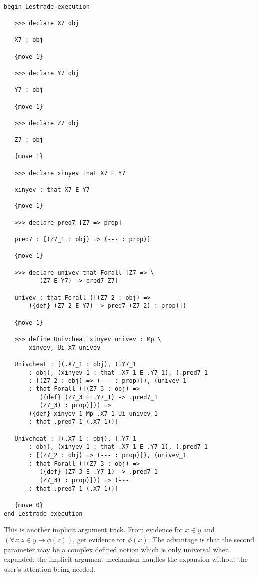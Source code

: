 \documentclass[12pt]{article}
\begin{document}
\begin{verbatim}

begin Lestrade execution

   >>> declare X7 obj

   X7 : obj

   {move 1}

   >>> declare Y7 obj

   Y7 : obj

   {move 1}

   >>> declare Z7 obj

   Z7 : obj

   {move 1}

   >>> declare xinyev that X7 E Y7

   xinyev : that X7 E Y7

   {move 1}

   >>> declare pred7 [Z7 => prop]

   pred7 : [(Z7_1 : obj) => (--- : prop)]

   {move 1}

   >>> declare univev that Forall [Z7 => \
          (Z7 E Y7) -> pred7 Z7]

   univev : that Forall ([(Z7_2 : obj) => 
       ({def} (Z7_2 E Y7) -> pred7 (Z7_2) : prop)])

   {move 1}

   >>> define Univcheat xinyev univev : Mp \
       xinyev, Ui X7 univev

   Univcheat : [(.X7_1 : obj), (.Y7_1 
       : obj), (xinyev_1 : that .X7_1 E .Y7_1), (.pred7_1 
       : [(Z7_2 : obj) => (--- : prop)]), (univev_1 
       : that Forall ([(Z7_3 : obj) => 
          ({def} (Z7_3 E .Y7_1) -> .pred7_1 
          (Z7_3) : prop)])) => 
       ({def} xinyev_1 Mp .X7_1 Ui univev_1 
       : that .pred7_1 (.X7_1))]

   Univcheat : [(.X7_1 : obj), (.Y7_1 
       : obj), (xinyev_1 : that .X7_1 E .Y7_1), (.pred7_1 
       : [(Z7_2 : obj) => (--- : prop)]), (univev_1 
       : that Forall ([(Z7_3 : obj) => 
          ({def} (Z7_3 E .Y7_1) -> .pred7_1 
          (Z7_3) : prop)])) => (--- 
       : that .pred7_1 (.X7_1))]

   {move 0}
end Lestrade execution
\end{verbatim}

This is another implicit argument trick.  From evidence for $x \in y$ and $(\forall z: z \in y \rightarrow \phi(z))$, get evidence for $\phi(x)$.  The advantage is
that the second parameter may be a complex defined notion which is only universal when expanded:  the implicit argument mechanism handles the expansion without the user's attention being needed.
\end{document}
